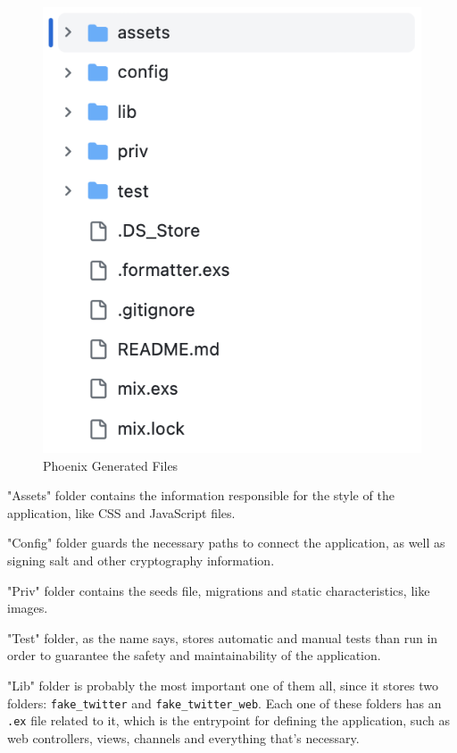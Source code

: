 \begin{figure}[htbp]
	\centering
	\includegraphics[scale=0.5]{figures/phx-folders.png}  %
	\caption{Phoenix Generated Files}
	\label{fig:phx}
\end{figure}

"Assets" folder contains the information responsible for the style of the application, like CSS and JavaScript files.

"Config" folder guards the necessary paths to connect the application, as well as signing salt and other cryptography information.

"Priv" folder contains the seeds file, migrations and static characteristics, like images.

"Test" folder, as the name says, stores automatic and manual tests than run in order to guarantee the safety and maintainability of the application.

"Lib" folder is probably the most important one of them all, since it stores two folders: \texttt{fake\_twitter} and \texttt{fake\_twitter\_web}. Each one of these folders has an \texttt{.ex} file related to it, which is the entrypoint for defining the application, such as web controllers, views, channels and everything that's necessary.

